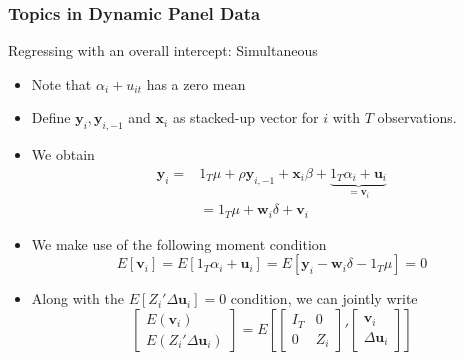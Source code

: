 \documentclass{beamer}
\begin{document}
\begin{frame}
\frametitle{Topics in Dynamic Panel Data}
Regressing with an overall intercept: Simultaneous
\begin{itemize}
\item  Note that $\alpha_i + u_{it}$ has a zero mean
\item Define $\mathbf{y}_i, \mathbf{y}_{i,-1}$ and $\mathbf{x}_i$ as stacked-up vector for $i$ with $T$ observations.
\item We obtain
\small{\begin{align*}
\mathbf{y}_i =& 1_T\mu+\rho\mathbf{y}_{i,-1}+\mathbf{x}_i\beta+\underbrace{1_T\alpha_i + \mathbf{u}_i}_{=\mathbf{v}_i}\\
&=1_T\mu+\mathbf{w}_i\delta+\mathbf{v}_i
\end{align*}}\normalsize
\item We make use of the following moment condition
\[
E[\mathbf{v}_i]=E[1_T\alpha_i + \mathbf{u}_i]=E[\mathbf{y}_i-\mathbf{w}_i\delta-1_T\mu]=0
\]
\item Along with the $E[Z_i'\Delta \mathbf{u}_i]=0$ condition, we can jointly write
\[
\begin{bmatrix}E(\mathbf{v}_i) \\ E(Z_i'\Delta \mathbf{u}_i) \end{bmatrix}=E\left[\begin{bmatrix}I_T & 0 \\ 0 & Z_i\end{bmatrix}'\begin{bmatrix}\mathbf{v}_i \\ \Delta\mathbf{u}_i \end{bmatrix}\right]
\]
\end{itemize}
\end{frame}
\end{document}
